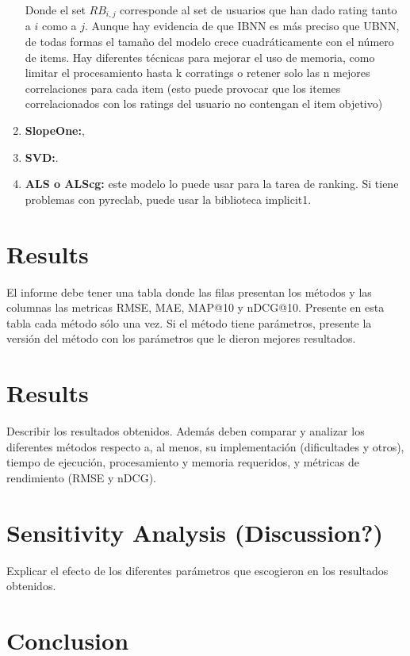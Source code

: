 \documentclass[letterpaper, 10 pt, conference]{ieeeconf}  %
\begin{document}
\begin{enumerate}
    Donde el set $RB_{i,j}$ corresponde al set de usuarios que han dado rating tanto a $i$ como a $j$. Aunque hay evidencia de que IBNN es más preciso que UBNN, de todas formas el tamaño del modelo crece cuadráticamente con el número de items. Hay diferentes técnicas para mejorar el uso de memoria, como limitar el procesamiento hasta k corratings o retener solo las n mejores correlaciones para cada item (esto puede provocar que los itemes correlacionados con los ratings del usuario no contengan el item objetivo)
    
    \item \textbf{SlopeOne:},
    \item \textbf{SVD:}.
    \item \textbf{ALS o ALScg:} este modelo lo puede usar para la tarea de ranking. Si tiene problemas con pyreclab, puede usar la biblioteca implicit1.
\end{enumerate}


\section{Results}

El informe debe tener una tabla donde las filas presentan
los métodos y las columnas las metricas RMSE, MAE, MAP@10 y nDCG@10. Presente en esta tabla cada método sólo una vez. Si el método tiene parámetros, presente la versión del método con los parámetros que le dieron mejores resultados.

\section{Results}

Describir los resultados obtenidos. Además deben comparar y
analizar los diferentes métodos respecto a, al menos, su implementación (dificultades y otros),
tiempo de ejecución, procesamiento y memoria requeridos, y métricas de rendimiento (RMSE y
nDCG).

\section{Sensitivity Analysis (Discussion?)}

Explicar el efecto de los diferentes parámetros
que escogieron en los resultados obtenidos.

\section{Conclusion}
\end{document}
